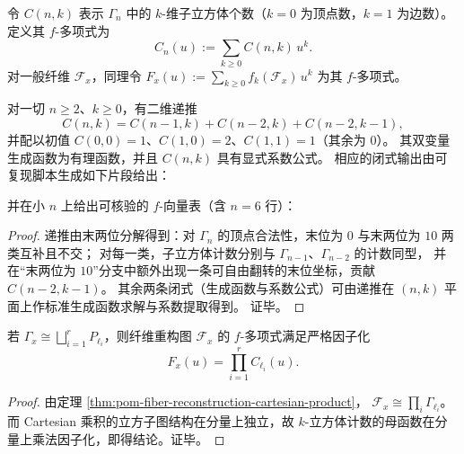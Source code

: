 \begin{definition}\label{def:pom-fibcube-fvector}
令 \(C(n,k)\) 表示 \(\Gamma_n\) 中的 \(k\)-维子立方体个数（\(k=0\) 为顶点数，\(k=1\) 为边数）。
定义其 \(f\)-多项式为
\[
C_n(u):=\sum_{k\ge 0} C(n,k)\,u^k.
\]
对一般纤维 \(\mathcal F_x\)，同理令
\(
F_x(u):=\sum_{k\ge 0} f_k(\mathcal F_x)\,u^k
\)
为其 \(f\)-多项式。
\end{definition}

\begin{theorem}\label{thm:pom-fibcube-fvector-closed}
对一切 \(n\ge 2\)、\(k\ge 0\)，有二维递推
\[
C(n,k)=C(n-1,k)+C(n-2,k)+C(n-2,k-1),
\]
并配以初值 \(C(0,0)=1\)、\(C(1,0)=2\)、\(C(1,1)=1\)（其余为 \(0\)）。
其双变量生成函数为有理函数，并且 \(C(n,k)\) 具有显式系数公式。
相应的闭式输出由可复现脚本生成如下片段给出：


并在小 \(n\) 上给出可核验的 \(f\)-向量表（含 \(n=6\) 行）：

\end{theorem}

\begin{proof}
递推由末两位分解得到：对 \(\Gamma_n\) 的顶点合法性，末位为 \(0\) 与末两位为 \(10\) 两类互补且不交；
对每一类，子立方体计数分别与 \(\Gamma_{n-1}\)、\(\Gamma_{n-2}\) 的计数同型，
并在“末两位为 \(10\)”分支中额外出现一条可自由翻转的末位坐标，贡献 \(C(n-2,k-1)\)。
其余两条闭式（生成函数与系数公式）可由递推在 \((n,k)\) 平面上作标准生成函数求解与系数提取得到。
证毕。
\end{proof}

\begin{corollary}[纤维 \(f\)-多项式的乘积因子化]\label{cor:pom-fiber-fpoly-factorization}
若 \(\Gamma_x\cong\bigsqcup_{i=1}^r P_{\ell_i}\)，则纤维重构图 \(\mathcal F_x\) 的 \(f\)-多项式满足严格因子化
\[
F_x(u)=\prod_{i=1}^r C_{\ell_i}(u).
\]
\end{corollary}
\begin{proof}
由定理 \ref{thm:pom-fiber-reconstruction-cartesian-product}，
\(
\mathcal F_x\cong \prod_i \Gamma_{\ell_i}
\)。
而 Cartesian 乘积的立方子图结构在分量上独立，故 \(k\)-立方体计数的母函数在分量上乘法因子化，即得结论。证毕。
\end{proof}

